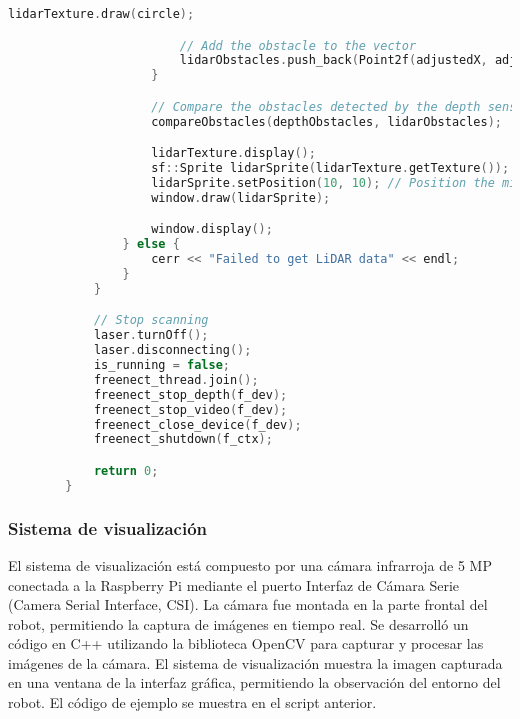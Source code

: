 \begin{lstlisting}[language={C++}, caption={C\'odigo de ejemplo de Kinect y LiDAR}, label={fresd}]
                        lidarTexture.draw(circle);

                        // Add the obstacle to the vector
                        lidarObstacles.push_back(Point2f(adjustedX, adjustedY));
                    }

                    // Compare the obstacles detected by the depth sensor and LiDAR
                    compareObstacles(depthObstacles, lidarObstacles);

                    lidarTexture.display();
                    sf::Sprite lidarSprite(lidarTexture.getTexture());
                    lidarSprite.setPosition(10, 10); // Position the minimap at the top-left corner
                    window.draw(lidarSprite);

                    window.display();
                } else {
                    cerr << "Failed to get LiDAR data" << endl;
                }
            }

            // Stop scanning
            laser.turnOff();
            laser.disconnecting();
            is_running = false;
            freenect_thread.join();
            freenect_stop_depth(f_dev);
            freenect_stop_video(f_dev);
            freenect_close_device(f_dev);
            freenect_shutdown(f_ctx);

            return 0;
        }

    \end{lstlisting}

    \subsubsection{Sistema de visualizaci\'on}
    El sistema de visualizaci\'on est\'a compuesto por una c\'amara infrarroja de 5 MP
        conectada a la Raspberry Pi mediante el puerto Interfaz de C\'amara Serie (Camera Serial Interface, CSI). La c\'amara fue montada en la parte
        frontal del robot, permitiendo la captura de im\'agenes en tiempo real.
    \vskip 0.5cm
    Se desarroll\'o un c\'odigo en C++ utilizando la biblioteca OpenCV para capturar y
        procesar las im\'agenes de la c\'amara. El sistema de visualizaci\'on muestra la imagen
        capturada en una ventana de la interfaz gr\'afica, permitiendo la observaci\'on del entorno
        del robot. El c\'odigo de ejemplo se muestra en el script anterior.
    \vskip 0.5cm
